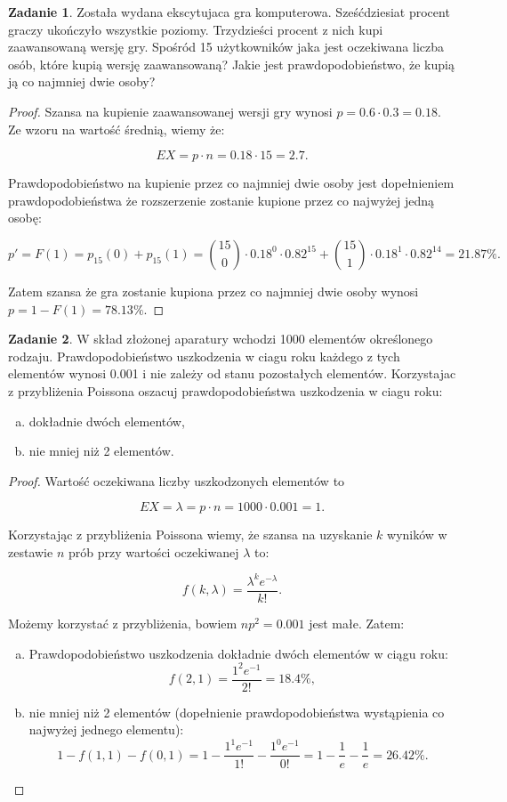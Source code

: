 \documentclass[11pt]{article}
\theoremstyle{definition}
\newtheorem{zadanie}{Zadanie}
\numberwithin{zadanie}{section}
\begin{document}
\begin{zadanie}
    Została wydana ekscytujaca gra komputerowa. Sześćdziesiat procent graczy ukończyło wszystkie poziomy. Trzydzieści procent z nich kupi zaawansowaną wersję gry. Spośród 15 użytkowników jaka jest oczekiwana liczba osób, które kupią wersję zaawansowaną? Jakie jest prawdopodobieństwo, że kupią ją co najmniej dwie osoby?
\end{zadanie}
\begin{proof}
    Szansa na kupienie zaawansowanej wersji gry wynosi $p=0.6\cdot0.3=0.18$. Ze wzoru na wartość średnią, wiemy że:

    $$EX = p\cdot n = 0.18\cdot15 = 2.7.$$

    Prawdopodobieństwo na kupienie przez co najmniej dwie osoby jest dopełnieniem prawdopodobieństwa że rozszerzenie zostanie kupione przez co najwyżej jedną osobę:

    $$p' = F(1) = p_{15}(0) + p_{15}(1) = \binom{15}{0}\cdot0.18^0\cdot0.82^{15}+\binom{15}{1}\cdot0.18^1\cdot0.82^{14} = 21.87\%.$$

    Zatem szansa że gra zostanie kupiona przez co najmniej dwie osoby wynosi $p=1-F(1) = 78.13\%$.

\end{proof}
\begin{zadanie}
    W skład złożonej aparatury wchodzi 1000 elementów określonego rodzaju. Prawdopodobieństwo uszkodzenia w ciagu
    roku każdego z tych elementów wynosi 0.001 i nie zależy od stanu pozostałych elementów. Korzystajac z przybliżenia
    Poissona oszacuj prawdopodobieństwa uszkodzenia w ciagu roku:

    \begin{enumerate}[a)]
        \item dokładnie dwóch elementów,
        \item nie mniej niż 2 elementów.
    \end{enumerate}

\end{zadanie}
\begin{proof}
    Wartość oczekiwana liczby uszkodzonych elementów to

    $$EX=\lambda=p\cdot n = 1000\cdot 0.001=1.$$

    Korzystając z przybliżenia Poissona wiemy, że szansa na uzyskanie $k$ wyników w zestawie $n$ prób przy wartości oczekiwanej $\lambda$ to:

    $$f(k,\lambda) = \frac{\lambda^ke^{-\lambda}}{k!}.$$

    Możemy korzystać z przybliżenia, bowiem $np^2=0.001$ jest małe. Zatem:

    \begin{enumerate}[a)]
        \item Prawdopodobieństwo uszkodzenia dokładnie dwóch elementów w ciągu roku:
              $$f(2,1) = \frac{1^2e^{-1}}{2!} = 18.4\%,$$
        \item nie mniej niż 2 elementów (dopełnienie prawdopodobieństwa wystąpienia co najwyżej jednego elementu):
              $$1 - f(1,1) - f(0,1) = 1-\frac{1^1e^{-1}}{1!} - \frac{1^0e^{-1}}{0!} = 1-\frac1e-\frac1e = 26.42\%.$$
    \end{enumerate}


\end{proof}
\end{document}

